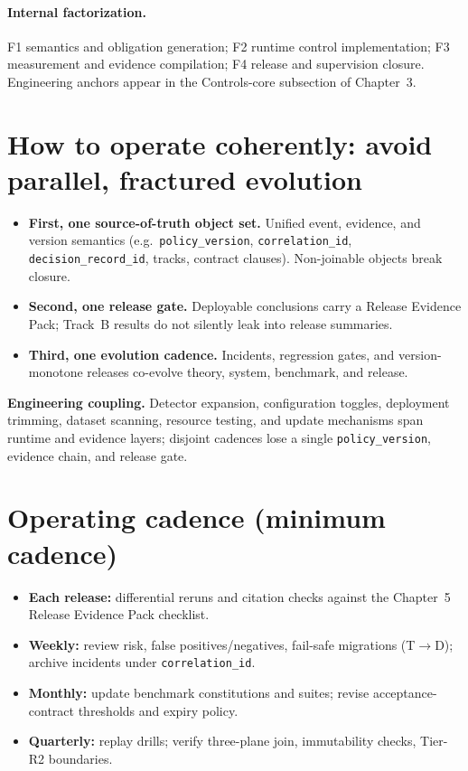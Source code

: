 \documentclass[11pt,a4paper]{report}
\begin{document}
\paragraph{Internal factorization.} F1 semantics and obligation generation; F2 runtime control implementation; F3 measurement and evidence compilation; F4 release and supervision closure. Engineering anchors appear in the Controls-core subsection of Chapter~3.

\section{How to operate coherently: avoid parallel, fractured evolution}
\begin{itemize}
  \item \textbf{First, one source-of-truth object set.} Unified event, evidence, and version semantics (e.g.\ \texttt{policy\_version}, \texttt{correlation\_id}, \texttt{decision\_record\_id}, tracks, contract clauses). Non-joinable objects break closure.
  \item \textbf{Second, one release gate.} Deployable conclusions carry a Release Evidence Pack; Track~B results do not silently leak into release summaries.
  \item \textbf{Third, one evolution cadence.} Incidents, regression gates, and version-monotone releases co-evolve theory, system, benchmark, and release.
\end{itemize}

\noindent\textbf{Engineering coupling.} Detector expansion, configuration toggles, deployment trimming, dataset scanning, resource testing, and update mechanisms span runtime and evidence layers; disjoint cadences lose a single \texttt{policy\_version}, evidence chain, and release gate.

\section{Operating cadence (minimum cadence)}
\begin{itemize}
  \item \textbf{Each release:} differential reruns and citation checks against the Chapter~5 Release Evidence Pack checklist.
  \item \textbf{Weekly:} review risk, false positives/negatives, fail-safe migrations (T$\rightarrow$D); archive incidents under \texttt{correlation\_id}.
  \item \textbf{Monthly:} update benchmark constitutions and suites; revise acceptance-contract thresholds and expiry policy.
  \item \textbf{Quarterly:} replay drills; verify three-plane join, immutability checks, Tier-R2 boundaries.
\end{itemize}
\end{document}
